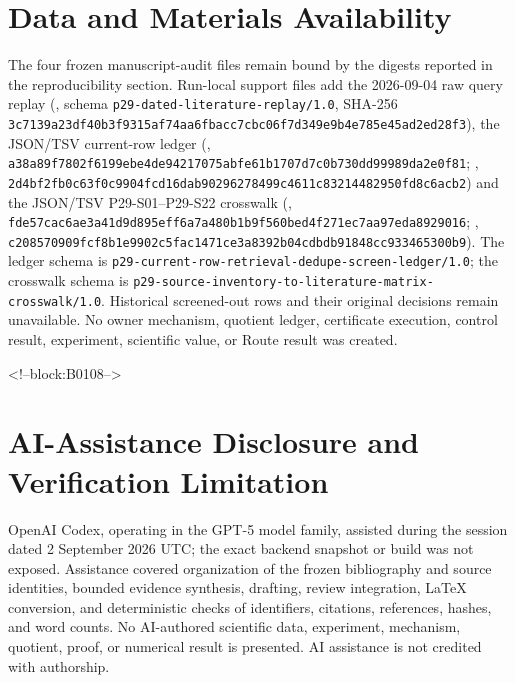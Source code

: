 \documentclass[11pt,a4paper]{article}
\begin{document}
\section*{Data and Materials Availability}
\begingroup\sloppy
The four frozen manuscript-audit files remain bound by the digests reported in the reproducibility section. Run-local support files add the 2026-09-04 raw query replay (, schema \texttt{p29-dated-literature-replay/1.0}, SHA-256 \texttt{3c7139a2\allowbreak{}3df40b3f\allowbreak{}9315af74\allowbreak{}aa6fbacc\allowbreak{}7cbc06f7\allowbreak{}d349e9b4\allowbreak{}e785e45a\allowbreak{}d2ed28f3}), the JSON/TSV current-row ledger (, \texttt{a38a89f7\allowbreak{}802f6199\allowbreak{}ebe4de94\allowbreak{}217075ab\allowbreak{}fe61b170\allowbreak{}7d7c0b73\allowbreak{}0dd99989\allowbreak{}da2e0f81}; , \texttt{2d4bf2fb\allowbreak{}0c63f0c9\allowbreak{}904fcd16\allowbreak{}dab90296\allowbreak{}278499c4\allowbreak{}611c8321\allowbreak{}4482950f\allowbreak{}d8c6acb2}) and the JSON/TSV P29-S01--P29-S22 crosswalk (, \texttt{fde57cac\allowbreak{}6ae3a41d\allowbreak{}9d895eff\allowbreak{}6a7a480b\allowbreak{}1b9f560b\allowbreak{}ed4f271e\allowbreak{}c7aa97ed\allowbreak{}a8929016}; , \texttt{c2085709\allowbreak{}09fcf8b1\allowbreak{}e9902c5f\allowbreak{}ac1471ce\allowbreak{}3a8392b0\allowbreak{}4cdbdb91\allowbreak{}848cc933\allowbreak{}465300b9}). The ledger schema is \texttt{p29-current-row-retrieval-dedupe-screen-ledger/1.0}; the crosswalk schema is \texttt{p29-\allowbreak{}source-\allowbreak{}inventory-\allowbreak{}to-\allowbreak{}literature-\allowbreak{}matrix-\allowbreak{}crosswalk/\allowbreak{}1.0}. Historical screened-out rows and their original decisions remain unavailable. No owner mechanism, quotient ledger, certificate execution, control result, experiment, scientific value, or Route result was created.\par\endgroup

<!--block:B0108-->
\section*{AI-Assistance Disclosure and Verification Limitation}
OpenAI Codex, operating in the GPT-5 model family, assisted during the session dated 2 September 2026 UTC; the exact backend snapshot or build was not exposed. Assistance covered organization of the frozen bibliography and source identities, bounded evidence synthesis, drafting, review integration, LaTeX conversion, and deterministic checks of identifiers, citations, references, hashes, and word counts. No AI-authored scientific data, experiment, mechanism, quotient, proof, or numerical result is presented. AI assistance is not credited with authorship.
\end{document}
